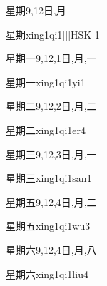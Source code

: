 \begin{Entry}{星期}{9,12}{⽇,⽉}
  \begin{Phonetics}{星期}{xing1qi1}[][HSK 1]
  \end{Phonetics}
\end{Entry}

\begin{Entry}{星期一}{9,12,1}{⽇,⽉,⼀}
  \begin{Phonetics}{星期一}{xing1qi1yi1}
  \end{Phonetics}
\end{Entry}

\begin{Entry}{星期二}{9,12,2}{⽇,⽉,⼆}
  \begin{Phonetics}{星期二}{xing1qi1er4}
  \end{Phonetics}
\end{Entry}

\begin{Entry}{星期三}{9,12,3}{⽇,⽉,⼀}
  \begin{Phonetics}{星期三}{xing1qi1san1}
  \end{Phonetics}
\end{Entry}

\begin{Entry}{星期五}{9,12,4}{⽇,⽉,⼆}
  \begin{Phonetics}{星期五}{xing1qi1wu3}
  \end{Phonetics}
\end{Entry}

\begin{Entry}{星期六}{9,12,4}{⽇,⽉,⼋}
  \begin{Phonetics}{星期六}{xing1qi1liu4}
  \end{Phonetics}
\end{Entry}

